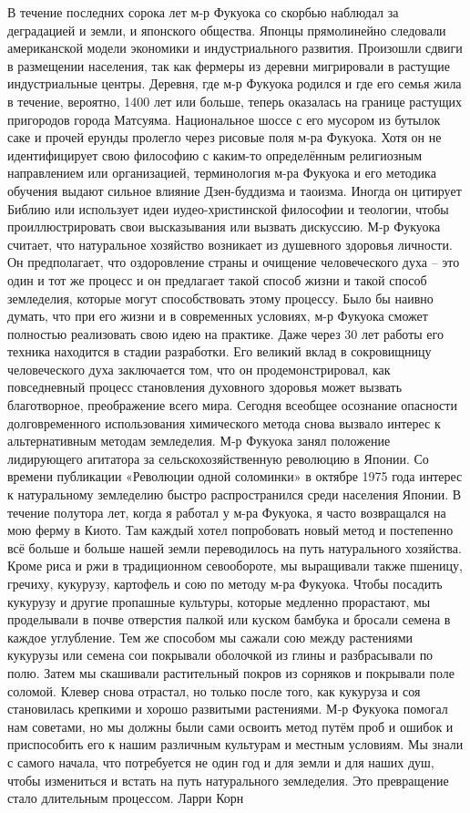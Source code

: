 \documentclass[a4paper]{book}
\begin{document}
В течение последних сорока лет м-р Фукуока со скорбью наблюдал за деградацией и
земли, и японского общества. Японцы прямолинейно следовали американской модели
экономики и индустриального развития. Произошли сдвиги в размещении населения, так как
фермеры из деревни мигрировали в растущие индустриальные центры. Деревня, где м-р
Фукуока родился и где его семья жила в течение, вероятно, 1400 лет или больше, теперь
оказалась на границе растущих пригородов города Матсуяма. Национальное шоссе с его
мусором из бутылок саке и прочей ерунды пролегло через рисовые поля м-ра Фукуока. Хотя
он не идентифицирует свою философию с каким-то определённым религиозным
направлением или организацией, терминология м-ра Фукуока и его методика обучения
выдают сильное влияние Дзен-буддизма и таоизма. Иногда он цитирует Библию или
использует идеи иудео-христинской философии и теологии, чтобы проиллюстрировать свои
высказывания или вызвать дискуссию.
М‑р Фукуока считает, что натуральное хозяйство возникает из душевного здоровья
личности. Он предполагает, что оздоровление страны и очищение человеческого духа – это
один и тот же процесс и он предлагает такой способ жизни и такой способ земледелия,
которые могут способствовать этому процессу.
Было бы наивно думать, что при его жизни и в современных условиях, м-р Фукуока
сможет полностью реализовать свою идею на практике. Даже через 30 лет работы его
техника находится в стадии разработки. Его великий вклад в сокровищницу человеческого
духа заключается том, что он продемонстрировал, как повседневный процесс становления
духовного здоровья может вызвать благотворное, преображение всего мира.
Сегодня всеобщее осознание опасности долговременного использования химического
метода снова вызвало интерес к альтернативным методам земледелия. М‑р Фукуока занял
положение лидирующего агитатора за сельскохозяйственную революцию в Японии. Со
времени публикации «Революции одной соломинки» в октябре 1975 года интерес к
натуральному земледелию быстро распространился среди населения Японии.
В течение полутора лет, когда я работал у м-ра Фукуока, я часто возвращался на мою
ферму в Киото. Там каждый хотел попробовать новый метод и постепенно всё больше и
больше нашей земли переводилось на путь натурального хозяйства. Кроме риса и ржи в
традиционном севообороте, мы выращивали также пшеницу, гречиху, кукурузу, картофель и
сою по методу м-ра Фукуока. Чтобы посадить кукурузу и другие пропашные культуры,
которые медленно прорастают, мы проделывали в почве отверстия палкой или куском
бамбука и бросали семена в каждое углубление. Тем же способом мы сажали сою между
растениями кукурузы или семена сои покрывали оболочкой из глины и разбрасывали по
полю. Затем мы скашивали растительный покров из сорняков и покрывали поле соломой.
Клевер снова отрастал, но только после того, как кукуруза и соя становилась крепкими и
хорошо развитыми растениями.
М‑р Фукуока помогал нам советами, но мы должны были сами освоить метод путём
проб и ошибок и приспособить его к нашим различным культурам и местным условиям. Мы
знали с самого начала, что потребуется не один год и для земли и для наших душ, чтобы
измениться и встать на путь натурального земледелия. Это превращение стало длительным
процессом.
Ларри Корн
\end{document}
